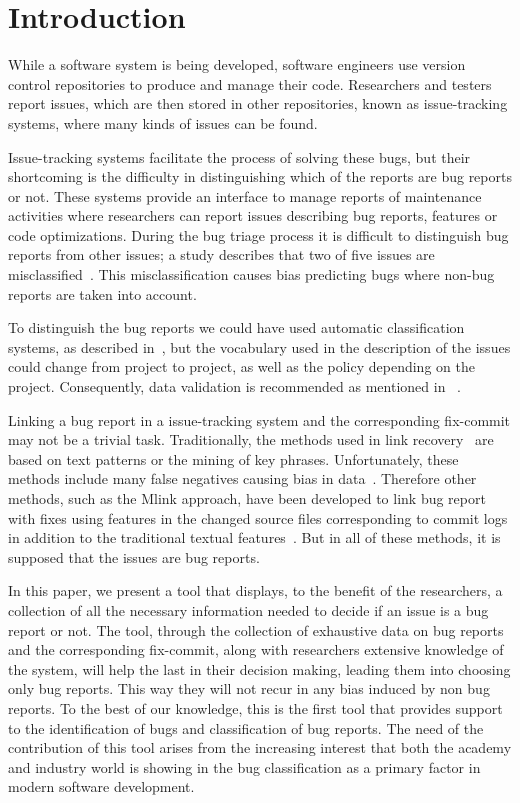 \documentclass[runningheads,a4paper]{llncs}
\begin{document}
\section{Introduction}

While a software system is being developed, software engineers use version control repositories to produce and manage their code. Researchers and testers report issues, which are then stored in other repositories, known as issue-tracking systems, where many kinds of issues can be found.

Issue-tracking systems facilitate the process of solving these bugs, but their shortcoming is the difficulty in distinguishing which of the reports are bug reports or not. These systems provide an interface to manage reports of maintenance activities where researchers can report issues describing bug reports, features or code optimizations. During the bug triage process it is difficult to distinguish bug reports from other issues; a study describes that two of five issues are misclassified~\cite{Herzig}. This misclassification causes bias predicting bugs where non-bug reports are taken into account.

To distinguish the bug reports we could have used automatic classification systems, as described in~\cite{Antoniol}, but the vocabulary used in the description of the issues could change from project to project, as well as the policy depending on the project. Consequently, data validation is recommended as mentioned in ~\cite{Herzig}.

Linking a bug report in a issue-tracking system and the corresponding fix-commit may not be a trivial task. Traditionally, the methods used in link recovery~\cite{Zimmermann,Thomas} are based on text patterns or the mining of key phrases. Unfortunately, these methods include many false negatives causing bias in data~\cite{Bird,NguyenTH}. Therefore other methods, such as the Mlink approach, have been developed to link bug report with fixes using features in the changed source files corresponding to commit logs in addition to the traditional textual features~\cite{Nguyen}. But in all of these methods, it is supposed that the issues are bug reports.

In this paper, we present a tool that displays, to the benefit of the researchers, a collection of all the necessary information needed to decide if an issue is a bug report or not. The tool, through the collection of exhaustive data on bug reports and the corresponding fix-commit, along with researchers extensive knowledge of the system, will help the last in their decision making, leading them into choosing only bug reports. This way they will not recur in any bias induced by non bug reports. To the best of our knowledge, this is the first tool that provides support to the identification of bugs and classification of bug reports. The need of the contribution of this tool arises from the increasing interest that both the academy and industry world is showing in the bug classification as a primary factor in modern software development.   
\end{document}
